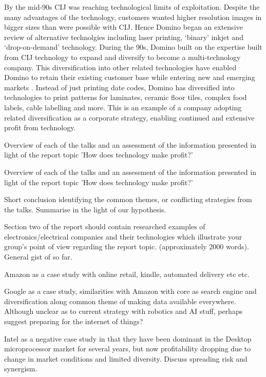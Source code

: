 \documentclass{elec6049Report}     %
\begin{document}
By the mid-90s CIJ was reaching technological limits of exploitation. 
Despite the many advantages of the technology, customers wanted higher resolution images in bigger sizes than were possible with CIJ. Hence Domino began an extensive review of alternative technolgies including laser printing, `binary' inkjet and `drop-on-demand' technology.
During the 90s, Domino built on the expertise built from CIJ technology to expand and diversify to become a multi-technology company. 
This diversification into other related technologies have enabled Domino to retain their existing customer base while entering new and emerging markets \cite{goffin2010innovation}.
Instead of just printing date codes, Domino has diversified into technologies to print patterns for laminates, ceramic floor tiles, complex food labels, cable labelling and more.
This is an example of a company adopting related diversification as a corporate strategy, enabling continued and extensive profit from technology.

Overview of each of the talks and an assessment of the information presented in light of the report topic 'How does technology make profit?' 

Overview of each of the talks and an assessment of the information presented in light of the report topic 'How does technology make profit?' 

Short conclusion identifying the common themes, or conflicting strategies from the talks.
Summarise in the light of our hypothesis.


Section two of the report should contain researched examples of electronics/electrical companies and their technologies which illustrate your group’s point of view regarding the report topic.   (approximately 2000 words).
General gist of so far.

Amazon as a case study with online retail, kindle, automated delivery etc etc.

Google as a case study, similarities with Amazon with core as search engine and diversification along common theme of making data available everywhere. Although unclear as to current strategy with robotics and AI stuff, perhaps suggest preparing for the internet of things?

Intel as a negative case study in that they have been dominant in the Desktop microprocessor market for several years, but now profitability dropping due to change in market conditions and limited diversity. Discuss spreading risk and synergism.
\end{document}
